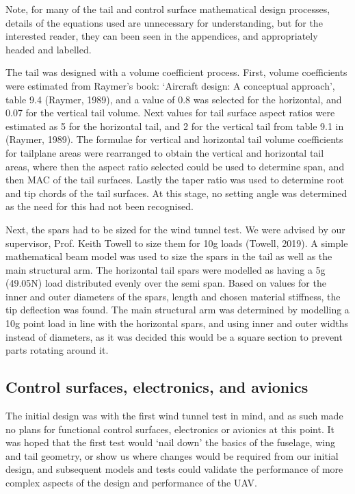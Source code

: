 \documentclass[../../main.tex]{subfiles}
\begin{document}
Note, for many of the tail and control surface mathematical design processes, details of the equations used are unnecessary for understanding, but for the interested reader, they can been seen in the appendices, and appropriately headed and labelled. 

The tail was designed with a volume coefficient process.
First, volume coefficients were estimated from Raymer’s book: ‘Aircraft design: A conceptual approach’, table 9.4 (Raymer, 1989), and a value of 0.8 was selected for the horizontal, and 0.07 for the vertical tail volume.
Next values for tail surface aspect ratios were estimated as 5 for the horizontal tail, and 2 for the vertical tail from table 9.1 in (Raymer, 1989).
The formulae for vertical and horizontal tail volume coefficients for tailplane areas were rearranged to obtain the vertical and horizontal tail areas, where then the aspect ratio selected could be used to determine span, and then MAC of the tail surfaces.
Lastly the taper ratio was used to determine root and tip chords of the tail surfaces.
At this stage, no setting angle was determined as the need for this had not been recognised. 

Next, the spars had to be sized for the wind tunnel test.
We were advised by our supervisor, Prof. Keith Towell to size them for 10g loads (Towell, 2019).
A simple mathematical beam model was used to size the spars in the tail as well as the main structural arm.
The horizontal tail spars were modelled as having a 5g (49.05N) load distributed evenly over the semi span.
Based on values for the inner and outer diameters of the spars, length and chosen material stiffness, the tip deflection was found.
The main structural arm was determined by modelling a 10g point load in line with the horizontal spars, and using inner and outer widths instead of diameters, as it was decided this would be a square section to prevent parts rotating around it.

\subsection{Control surfaces, electronics, and avionics} \label{sec:design-process:initial-designs:control-surfaces-electronics-and-avionics}

The initial design was with the first wind tunnel test in mind, and as such made no plans for functional control surfaces, electronics or avionics at this point.
It was hoped that the first test would ‘nail down’ the basics of the fuselage, wing and tail geometry, or show us where changes would be required from our initial design, and subsequent models and tests could validate the performance of more complex aspects of the design and performance of the UAV. 
\end{document}
